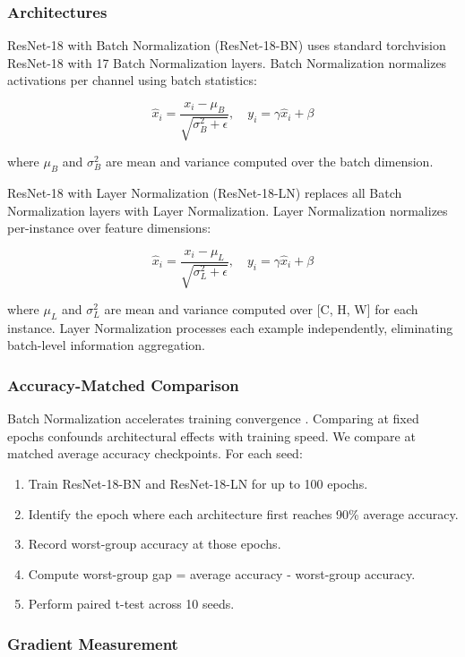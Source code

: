 
\subsubsection{Architectures}

ResNet-18 with Batch Normalization (ResNet-18-BN) uses standard torchvision ResNet-18 with 17 Batch Normalization layers. Batch Normalization normalizes activations per channel using batch statistics:

$$
\hat{x}_i = \frac{x_i - \mu_B}{\sqrt{\sigma_B^2 + \epsilon}}, \quad y_i = \gamma \hat{x}_i + \beta
$$

where $\mu _B$ and $\sigma ^{2}_B$ are mean and variance computed over the batch dimension.

ResNet-18 with Layer Normalization (ResNet-18-LN) replaces all Batch Normalization layers with Layer Normalization. Layer Normalization normalizes per-instance over feature dimensions:

$$
\hat{x}_i = \frac{x_i - \mu_L}{\sqrt{\sigma_L^2 + \epsilon}}, \quad y_i = \gamma \hat{x}_i + \beta
$$

where $\mu _L$ and $\sigma ^{2}_L$ are mean and variance computed over [C, H, W] for each instance. Layer Normalization processes each example independently, eliminating batch-level information aggregation.

\subsubsection{Accuracy-Matched Comparison}

Batch Normalization accelerates training convergence \citep{Santurkar2019How}. Comparing at fixed epochs confounds architectural effects with training speed. We compare at matched average accuracy checkpoints. For each seed:

\begin{enumerate}
\item Train ResNet-18-BN and ResNet-18-LN for up to 100 epochs.
\item Identify the epoch where each architecture first reaches 90\% average accuracy.
\item Record worst-group accuracy at those epochs.
\item Compute worst-group gap = average accuracy - worst-group accuracy.
\item Perform paired t-test across 10 seeds.
\end{enumerate}

\subsubsection{Gradient Measurement}


